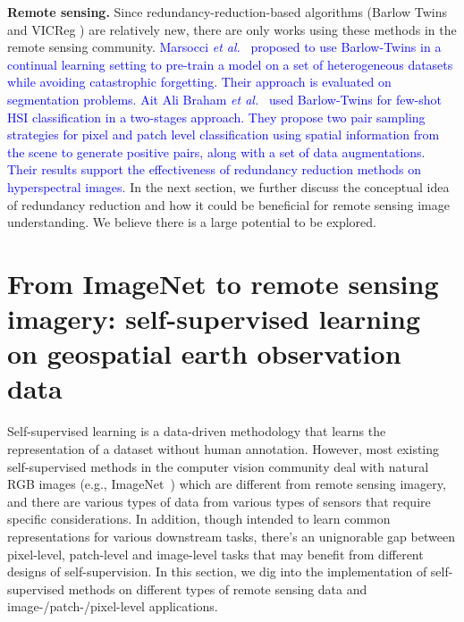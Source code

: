 \documentclass[lettersize,journal]{IEEEtran}
\newcommand{\etal}{\textit{et al.}}
\begin{document}
\textbf{Remote sensing.} Since redundancy-reduction-based algorithms (Barlow Twins \cite{zbontar2021barlow} and VICReg \cite{bardes2021vicreg}) are relatively new, there are only works using these methods in the remote sensing community. \textcolor{blue}{Marsocci \etal~\cite{marsocci2022continual} proposed to use Barlow-Twins in a continual learning setting to pre-train a model on a set of heterogeneous datasets while avoiding catastrophic forgetting. Their approach is evaluated on segmentation problems. Ait Ali Braham \etal~ \cite{nassim2022self} used Barlow-Twins for few-shot HSI classification in a two-stages approach. They propose two pair sampling strategies for pixel and patch level classification using spatial information from the scene to generate positive pairs, along with a set of data augmentations. Their results support the effectiveness of redundancy reduction methods on hyperspectral images.} In the next section, we further discuss the conceptual idea of redundancy reduction and how it could be beneficial for remote sensing image understanding. We believe there is a large potential to be explored.









\section{From ImageNet to remote sensing imagery: self-supervised learning on geospatial earth observation data}
\label{sec:ssl-in-rs}

Self-supervised learning is a data-driven methodology that learns the representation of a dataset without human annotation. However, most existing self-supervised methods in the computer vision community deal with natural RGB images (e.g., ImageNet~\cite{deng2009imagenet}) which are different from remote sensing imagery, and there are various types of data from various types of sensors that require specific considerations. In addition, though intended to learn common representations for various downstream tasks, there's an unignorable gap between pixel-level, patch-level and image-level tasks that may benefit from different designs of self-supervision. In this section, we dig into the implementation of self-supervised methods on different types of remote sensing data and image-/patch-/pixel-level applications.
\end{document}
